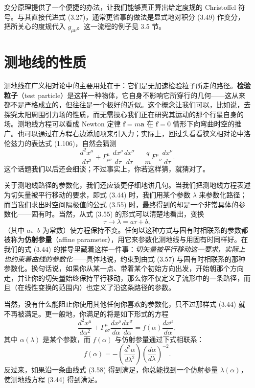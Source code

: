 变分原理提供了一个便捷的办法，让我们能够真正算出给定度规的 Christoffel 符号。与其直接代进式 (3.27)，通常更省事的做法是显式地对积分 (3.49) 作变分，把所关心的度规代入 $g_{\mu\nu}$。这一流程的例子见 3.5 节。

\section{测地线的性质}

测地线在广义相对论中的主要用处在于：它们是无加速检验粒子所走的路径。\textbf{检验粒子}（test particle）是这样一种物体，它自身不影响它所穿行的几何——这从来都不是严格成立的，但往往是一个极好的近似。这个概念让我们可以，比如说，去探究太阳周围引力场的性质，而无需操心我们正在研究其运动的那个行星自身的场。测地线方程可以看成 Newton 定律 $\textbf{f} = m\textbf{a}$ 在 $\textbf{f} = 0$ 情形下向弯曲时空的推广。也可以通过在方程右边添加项来引入力；实际上，回过头看看狭义相对论中洛伦兹力的表达式 (1.106)，自然会猜测
\begin{equation*}
\frac{d^2x^\mu}{d\tau^2} + \Gamma^\mu_{\rho\sigma}\frac{dx^\rho}{d\tau}\frac{dx^\sigma}{d\tau} = \frac{q}{m}F^\mu{}_\nu\frac{dx^\nu}{d\tau}.
\tag{3.56}
\end{equation*}
这个话题我们以后还会细谈；不过事实上，你若这样猜，就猜对了。

关于测地线路径的参数化，我们还应该更仔细地讲几句。当我们把测地线方程表述为切矢量被平行移动的要求，即式 (3.44) 时，我们用某个参数 $\lambda$ 来参数化路径；而当我们求出时空间隔极值的公式 (3.55) 时，最终得到的却是一个非常具体的参数化——固有时。当然，从式 (3.55) 的形式可以清楚地看出，变换
\begin{equation*}
\tau \rightarrow \lambda = a\tau + b,
\tag{3.57}
\end{equation*}
（其中 $a$、$b$ 为常数）使方程保持不变。任何以这种方式与固有时相联系的参数都被称为\textbf{仿射参量}（affine parameter），用它来参数化测地线与用固有时同样好。在我们的式 (3.44) 的推导里藏着这样一件事：\emph{切矢量被平行移动这一要求，实际上也约束着曲线的参数化}——具体地说，约束到由式 (3.57) 与固有时相联系的那种参数化。换句话说，如果你从某一点、带着某个初始方向出发，开始朝那个方向走，并让你的切矢量始终保持平行移动，那么你不仅定义了流形中的一条路径，而且（在线性变换的范围内）也定义了沿这条路径的参数。

当然，没有什么能阻止你使用其他任何你喜欢的参数化，只不过那样式 (3.44) 就不再被满足。更一般地，你满足的将是如下形式的方程
\begin{equation*}
\frac{d^2x^\mu}{d\alpha^2} + \Gamma^\mu_{\rho\sigma}\frac{dx^\rho}{d\alpha}\frac{dx^\sigma}{d\alpha} = f(\alpha)\frac{dx^\mu}{d\alpha},
\tag{3.58}
\end{equation*}
其中 $\alpha(\lambda)$ 是某个参数，而 $f(\alpha)$ 与仿射参量通过下式相联系：
\begin{equation*}
f(\alpha) = -\left(\frac{d^2\alpha}{d\lambda^2}\right)\left(\frac{d\alpha}{d\lambda}\right)^{-2}.
\tag{3.59}
\end{equation*}
反过来，如果沿一条曲线式 (3.58) 得到满足，你总能找到一个仿射参量 $\lambda(\alpha)$，使测地线方程 (3.44) 得到满足。

